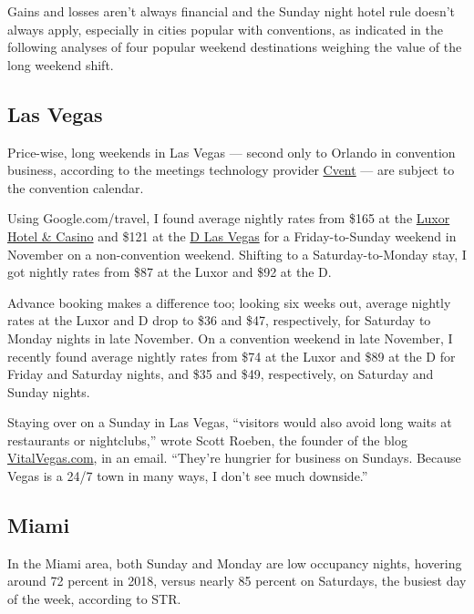 Gains and losses aren't always financial and the Sunday night hotel rule
doesn't always apply, especially in cities popular with conventions, as
indicated in the following analyses of four popular weekend destinations
weighing the value of the long weekend shift.

\hypertarget{las-vegas}{%
\subsection{Las Vegas}\label{las-vegas}}

Price-wise, long weekends in Las Vegas --- second only to Orlando in
convention business, according to the meetings technology provider
\href{https://www.cvent.com/en/press-release/cvent-unveils-lists-top-meeting-destinations-worldwide-2018}{Cvent}
--- are subject to the convention calendar.

Using Google.com/travel, I found average nightly rates from \$165 at the
\href{https://luxor.mgmresorts.com/en.html?ecid=GMB_Hotel_Luxor\#/}{Luxor
Hotel \& Casino} and \$121 at the \href{https://www.thed.com/}{D Las
Vegas} for a Friday-to-Sunday weekend in November on a non-convention
weekend. Shifting to a Saturday-to-Monday stay, I got nightly rates from
\$87 at the Luxor and \$92 at the D.

Advance booking makes a difference too; looking six weeks out, average
nightly rates at the Luxor and D drop to \$36 and \$47, respectively,
for Saturday to Monday nights in late November. On a convention weekend
in late November, I recently found average nightly rates from \$74 at
the Luxor and \$89 at the D for Friday and Saturday nights, and \$35 and
\$49, respectively, on Saturday and Sunday nights.

Staying over on a Sunday in Las Vegas, ``visitors would also avoid long
waits at restaurants or nightclubs,'' wrote Scott Roeben, the founder of
the blog \href{https://vitalvegas.com/}{VitalVegas.com}, in an email.
``They're hungrier for business on Sundays. Because Vegas is a 24/7 town
in many ways, I don't see much downside.''

\hypertarget{miami}{%
\subsection{Miami}\label{miami}}

In the Miami area, both Sunday and Monday are low occupancy nights,
hovering around 72 percent in 2018, versus nearly 85 percent on
Saturdays, the busiest day of the week, according to STR.

